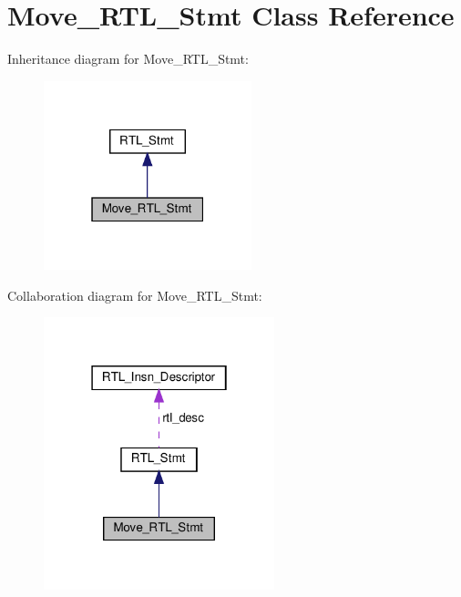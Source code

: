 \hypertarget{classMove__RTL__Stmt}{}\section{Move\+\_\+\+R\+T\+L\+\_\+\+Stmt Class Reference}
\label{classMove__RTL__Stmt}


Inheritance diagram for Move\+\_\+\+R\+T\+L\+\_\+\+Stmt\+:
\nopagebreak
\begin{figure}[H]
\begin{center}
\leavevmode
\includegraphics[width=171pt]{classMove__RTL__Stmt__inherit__graph}
\end{center}
\end{figure}


Collaboration diagram for Move\+\_\+\+R\+T\+L\+\_\+\+Stmt\+:
\nopagebreak
\begin{figure}[H]
\begin{center}
\leavevmode
\includegraphics[width=190pt]{classMove__RTL__Stmt__coll__graph}
\end{center}
\end{figure}
